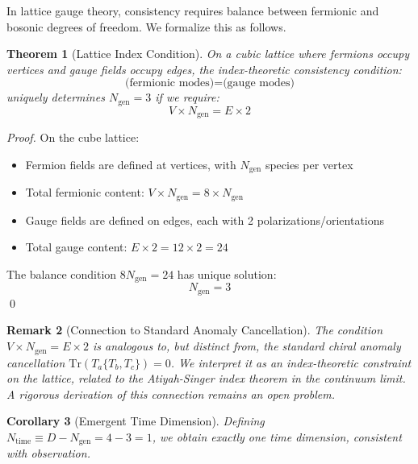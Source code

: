 \documentclass[twocolumn,showpacs,preprintnumbers,amsmath,amssymb,prd]{revtex4-2}
\newtheorem{theorem}{Theorem}[section]
\newtheorem{corollary}[theorem]{Corollary}
\newtheorem{remark}[theorem]{Remark}
\begin{document}
In lattice gauge theory, consistency requires balance between fermionic and bosonic degrees of freedom. We formalize this as follows.

\begin{theorem}[Lattice Index Condition]
\label{thm:index}
On a cubic lattice where fermions occupy vertices and gauge fields occupy edges, the index-theoretic consistency condition:
\begin{equation}
\text{(fermionic modes)} = \text{(gauge modes)}
\end{equation}
uniquely determines $N_{\text{gen}} = 3$ if we require:
\begin{equation}
V \times N_{\text{gen}} = E \times 2
\end{equation}
\end{theorem}

\begin{proof}
On the cube lattice:
\begin{itemize}
\item Fermion fields are defined at vertices, with $N_{\text{gen}}$ species per vertex
\item Total fermionic content: $V \times N_{\text{gen}} = 8 \times N_{\text{gen}}$
\item Gauge fields are defined on edges, each with 2 polarizations/orientations
\item Total gauge content: $E \times 2 = 12 \times 2 = 24$
\end{itemize}

The balance condition $8 N_{\text{gen}} = 24$ has unique solution:
\begin{equation}
\boxed{N_{\text{gen}} = 3}
\end{equation}
\qed
\end{proof}

\begin{remark}[Connection to Standard Anomaly Cancellation]
The condition $V \times N_{\text{gen}} = E \times 2$ is analogous to, but distinct from, the standard chiral anomaly cancellation $\text{Tr}(T_a\{T_b, T_c\}) = 0$. We interpret it as an index-theoretic constraint on the lattice, related to the Atiyah-Singer index theorem in the continuum limit. A rigorous derivation of this connection remains an open problem.
\end{remark}

\begin{corollary}[Emergent Time Dimension]
\label{cor:time}
Defining $N_{\text{time}} \equiv D - N_{\text{gen}} = 4 - 3 = 1$, we obtain exactly one time dimension, consistent with observation.
\end{corollary}
\end{document}
